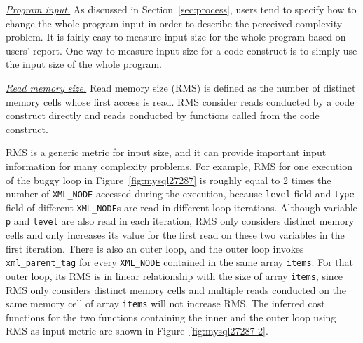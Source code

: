 \underline{\textit{Program input.}}
As discussed in Section~\ref{sec:process}, 
users tend to specify how to change the whole program 
input in order to describe the perceived complexity problem.
It is fairly easy to measure input size for the whole program based on users' report.
One way to measure input size for a code construct
is to simply use the input size of the whole program. 


\underline{\textit{Read memory size.}}
Read memory size (RMS) is defined as the number of distinct memory cells 
whose first access is read. 
RMS consider reads conducted by a code construct directly 
and reads conducted by 
functions called from the code construct. 



RMS is a generic metric for input size, 
and it can provide important input information for many complexity problems.   
For example, 
RMS for one execution of
the buggy loop in Figure~\ref{fig:mysql27287}
is roughly equal to 2 times the number of \texttt{XML\_NODE} 
accessed during the execution, 
because \texttt{level} field and \texttt{type} field of 
different \texttt{XML\_NODE}s are read in different loop iterations.
Although variable \texttt{p} and \texttt{level} are also read in each iteration,
RMS only considers distinct memory cells and 
only increases its value for the first read on these two variables in the first iteration. 
There is also an outer loop, 
and the outer loop invokes \texttt{xml\_parent\_tag} 
for every \texttt{XML\_NODE} contained
in the same array \texttt{items}. 
For that outer loop, its RMS is in linear relationship 
with the size of array \texttt{items}, 
since RMS only considers distinct memory cells 
and multiple reads conducted on the same memory 
cell of array \texttt{items} will not increase RMS. 
The inferred cost functions for the two functions 
containing the inner and the outer loop using RMS as input metric are shown 
in Figure~\ref{fig:mysql27287-2}.

